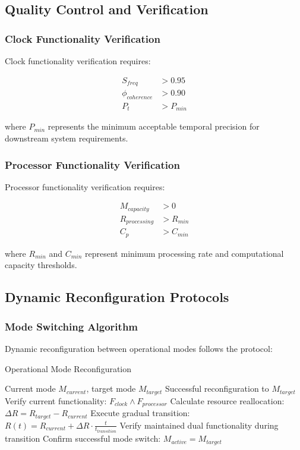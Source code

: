 \subsection{Quality Control and Verification}

\subsubsection{Clock Functionality Verification}

Clock functionality verification requires:

\begin{align}
S_{freq} &> 0.95 \\
\phi_{coherence} &> 0.90 \\
P_t &> P_{min}
\end{align}

where $P_{min}$ represents the minimum acceptable temporal precision for downstream system requirements.

\subsubsection{Processor Functionality Verification}

Processor functionality verification requires:

\begin{align}
M_{capacity} &> 0 \\
R_{processing} &> R_{min} \\
C_p &> C_{min}
\end{align}

where $R_{min}$ and $C_{min}$ represent minimum processing rate and computational capacity thresholds.

\subsection{Dynamic Reconfiguration Protocols}

\subsubsection{Mode Switching Algorithm}

Dynamic reconfiguration between operational modes follows the protocol:

\begin{algorithm}[H]
\caption{Operational Mode Reconfiguration}
\begin{algorithmic}[1]
\REQUIRE Current mode $M_{current}$, target mode $M_{target}$
\ENSURE Successful reconfiguration to $M_{target}$
\STATE Verify current functionality: $F_{clock} \land F_{processor}$
\STATE Calculate resource reallocation: $\Delta R = R_{target} - R_{current}$
\STATE Execute gradual transition: $R(t) = R_{current} + \Delta R \cdot \frac{t}{t_{transition}}$
\STATE Verify maintained dual functionality during transition
\STATE Confirm successful mode switch: $M_{active} = M_{target}$
\end{algorithmic}
\end{algorithm}

